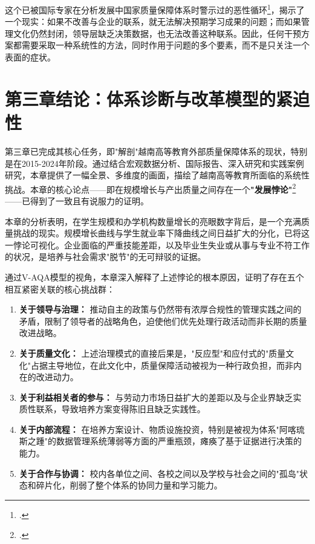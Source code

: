这个已被国际专家在分析发展中国家质量保障体系时警示过的恶性循环\footcite{aunsec_redesigningIQA_2022}，揭示了一个现实：如果不改善与企业的联系，就无法解决预期学习成果的问题；而如果管理文化仍然封闭，领导层缺乏决策数据，也无法改善这种联系。因此，任何干预方案都需要采取一种系统性的方法，同时作用于问题的多个要素，而不是只关注一个表面的症状。




\section*{第三章结论：体系诊断与改革模型的紧迫性}

第三章已完成其核心任务，即"解剖"越南高等教育外部质量保障体系的现状，特别是在2015-2024年阶段。通过结合宏观数据分析、国际报告、深入研究和实践案例研究，本章提供了一幅全景、多维度的画面，描绘了越南高等教育所面临的系统性挑战。本章的核心论点——即在规模增长与产出质量之间存在一个\textbf{"发展悖论"}\footcite{aunsec_redesigningIQA_2022}——已得到了一致且有说服力的证明。

本章的分析表明，在学生规模和办学机构数量增长的亮眼数字背后，是一个充满质量挑战的现实。规模增长曲线与学生就业率下降曲线之间日益扩大的分化，已将这一悖论可视化。企业面临的严重技能差距，以及毕业生失业或从事与专业不符工作的状况，是培养与社会需求"脱节"的无可辩驳的证据。

通过V-AQA模型的视角，本章深入解释了上述悖论的根本原因，证明了存在五个相互紧密关联的核心挑战群：
\begin{enumerate}
    \item \textbf{关于领导与治理：} 推动自主的政策与仍然带有浓厚合规性的管理实践之间的矛盾，限制了领导者的战略角色，迫使他们优先处理行政活动而非长期的质量改进战略。
    
    \item \textbf{关于质量文化：} 上述治理模式的直接后果是，"反应型"和应付式的"质量文化"占据主导地位，在此文化中，质量保障活动被视为一种行政负担，而非内在的改进动力。
    
    \item \textbf{关于利益相关者的参与：} 与劳动力市场日益扩大的差距以及与企业界缺乏实质性联系，导致培养方案变得陈旧且缺乏实践性。
    
    \item \textbf{关于内部流程：} 在培养方案设计、物质设施投资，特别是被视为体系"阿喀琉斯之踵"的数据管理系统薄弱等方面的严重瓶颈，瘫痪了基于证据进行决策的能力。
    
    \item \textbf{关于合作与协调：} 校内各单位之间、各校之间以及学校与社会之间的"孤岛"状态和碎片化，削弱了整个体系的协同力量和学习能力。
\end{enumerate}

